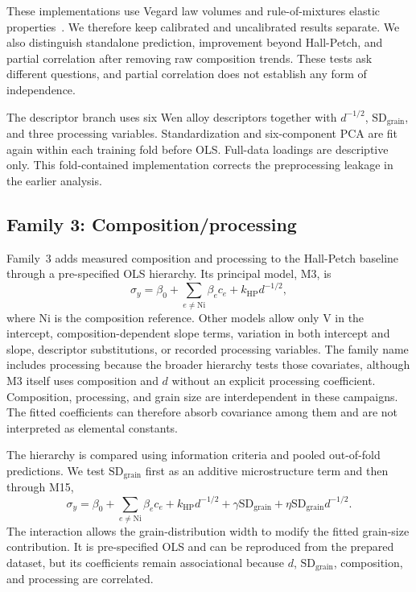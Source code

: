 \documentclass[5p,times,twocolumn]{elsarticle}
\newcommand{\familythree}{Composition\slash processing}
\begin{document}
These implementations use Vegard law volumes and rule-of-mixtures elastic properties~\cite{Varvenne2016,Varvenne2017,Labusch1970,TodaCaraballo2015}. We therefore keep calibrated and uncalibrated results separate. We also distinguish standalone prediction, improvement beyond Hall-Petch, and partial correlation after removing raw composition trends. These tests ask different questions, and partial correlation does not establish any form of independence.

The descriptor branch uses six Wen alloy descriptors together with $d^{-1/2}$, $\mathrm{SD}_{\mathrm{grain}}$, and three processing variables. Standardization and six-component PCA are fit again within each training fold before OLS. Full-data loadings are descriptive only. This fold-contained implementation corrects the preprocessing leakage in the earlier analysis.

\subsection{Family 3: \familythree}

Family~3 adds measured composition and processing to the Hall-Petch baseline through a pre-specified OLS hierarchy. Its principal model, M3, is
\begin{equation}
\sigma_y=\beta_0+\sum_{e\ne\mathrm{Ni}}\beta_e c_e
              +k_{\mathrm{HP}}d^{-1/2},
\label{eq:m3}
\end{equation}
where Ni is the composition reference. Other models allow only V in the intercept, composition-dependent slope terms, variation in both intercept and slope, descriptor substitutions, or recorded processing variables. The family name includes processing because the broader hierarchy tests those covariates, although M3 itself uses composition and $d$ without an explicit processing coefficient. Composition, processing, and grain size are interdependent in these campaigns. The fitted coefficients can therefore absorb covariance among them and are not interpreted as elemental constants.

The hierarchy is compared using information criteria and pooled out-of-fold predictions. We test $\mathrm{SD}_{\mathrm{grain}}$ first as an additive microstructure term and then through M15,
\begin{equation}
\sigma_y=\beta_0+\sum_{e\ne\mathrm{Ni}}\beta_e c_e
 +k_{\mathrm{HP}}d^{-1/2}+\gamma\mathrm{SD}_{\mathrm{grain}}
 +\eta\mathrm{SD}_{\mathrm{grain}}d^{-1/2}.
\label{eq:m15}
\end{equation}
The interaction allows the grain-distribution width to modify the fitted grain-size contribution. It is pre-specified OLS and can be reproduced from the prepared dataset, but its coefficients remain associational because $d$, $\mathrm{SD}_{\mathrm{grain}}$, composition, and processing are correlated.
\end{document}
